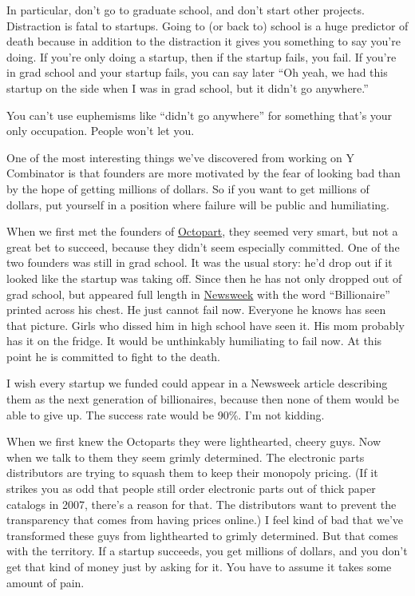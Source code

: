 In particular, don't go to graduate school, and don't start other
projects. Distraction is fatal to startups. Going to (or back to) school
is a huge predictor of death because in addition to the distraction it
gives you something to say you're doing. If you're only doing a startup,
then if the startup fails, you fail. If you're in grad school and your
startup fails, you can say later ``Oh yeah, we had this startup on the
side when I was in grad school, but it didn't go anywhere.''

You can't use euphemisms like ``didn't go anywhere'' for something
that's your only occupation. People won't let you.

One of the most interesting things we've discovered from working on Y
Combinator is that founders are more motivated by the fear of looking
bad than by the hope of getting millions of dollars. So if you want to
get millions of dollars, put yourself in a position where failure will
be public and humiliating.

When we first met the founders of \href{http://octopart.com}{Octopart},
they seemed very smart, but not a great bet to succeed, because they
didn't seem especially committed. One of the two founders was still in
grad school. It was the usual story: he'd drop out if it looked like the
startup was taking off. Since then he has not only dropped out of grad
school, but appeared full length in
\href{http://docs.octopart.com/newsweek_octopart_small.jpg}{Newsweek}
with the word ``Billionaire'' printed across his chest. He just cannot
fail now. Everyone he knows has seen that picture. Girls who dissed him
in high school have seen it. His mom probably has it on the fridge. It
would be unthinkably humiliating to fail now. At this point he is
committed to fight to the death.

I wish every startup we funded could appear in a Newsweek article
describing them as the next generation of billionaires, because then
none of them would be able to give up. The success rate would be 90\%.
I'm not kidding.

When we first knew the Octoparts they were lighthearted, cheery guys.
Now when we talk to them they seem grimly determined. The electronic
parts distributors are trying to squash them to keep their monopoly
pricing. (If it strikes you as odd that people still order electronic
parts out of thick paper catalogs in 2007, there's a reason for that.
The distributors want to prevent the transparency that comes from having
prices online.) I feel kind of bad that we've transformed these guys
from lighthearted to grimly determined. But that comes with the
territory. If a startup succeeds, you get millions of dollars, and you
don't get that kind of money just by asking for it. You have to assume
it takes some amount of pain.

